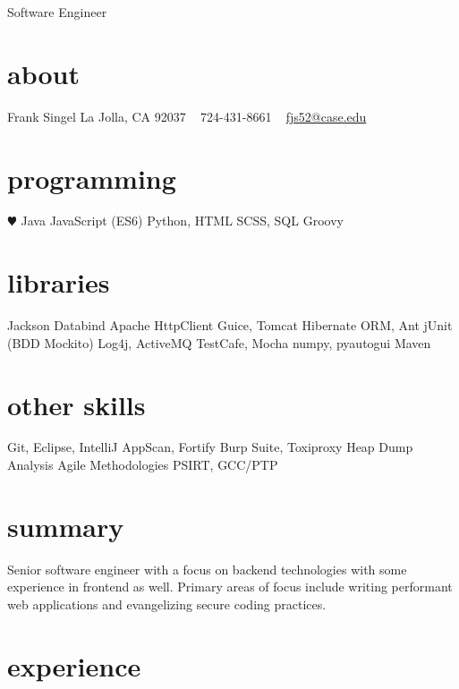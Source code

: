 \documentclass[]{friggeri-cv}
\begin{document}
       {Software Engineer}


\begin{aside}
  \section{about}
    Frank Singel
    La Jolla, CA
    92037
    ~
    724-431-8661
    ~
    \href{mailto:fjs52@case.edu}{fjs52@case.edu}
  \section{programming}
    {\color{red} $\varheartsuit$} Java
    JavaScript (ES6)
    Python, HTML
    SCSS, SQL
    Groovy
  \section{libraries}
    Jackson Databind
    Apache HttpClient 
    Guice, Tomcat
    Hibernate ORM, Ant
    jUnit (BDD Mockito)
    Log4j, ActiveMQ
    TestCafe, Mocha
    numpy, pyautogui
    Maven
  \section{other skills}
    Git, Eclipse, IntelliJ
    AppScan, Fortify
    Burp Suite, Toxiproxy
    Heap Dump Analysis
    Agile Methodologies 
    PSIRT, GCC/PTP
    
\end{aside}

\section{summary}
Senior software engineer with a focus on backend technologies with some experience in frontend as well. Primary areas of focus include writing performant web applications and evangelizing secure coding practices.

\section{experience}
\end{document}
